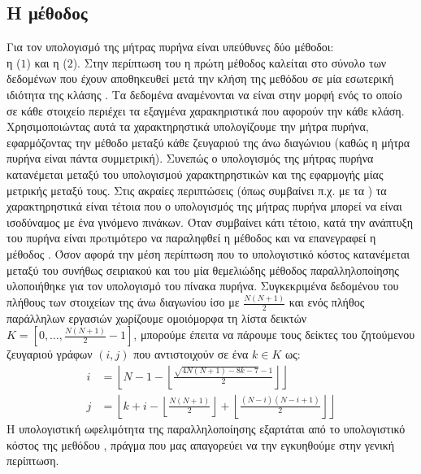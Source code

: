 \subsection{Η μέθοδος \texttt{}}
Για τον υπολογισμό της μήτρας πυρήνα είναι υπεύθυνες δύο μέθοδοι:\\ η \texttt{} ($1$) και  η \texttt{} ($2$).
Στην περίπτωση του \texttt{} η πρώτη μέθοδος καλείται στο σύνολο των δεδομένων που έχουν αποθηκευθεί μετά την κλήση της μεθόδου \texttt{} σε μία εσωτερική ιδιότητα της κλάσης \texttt{}.
Τα δεδομένα αναμένονται να είναι στην μορφή ενός \texttt{} το οποίο σε κάθε στοιχείο περιέχει τα εξαγμένα χαρακηριστικά που αφορούν την κάθε κλάση.
Χρησιμοποιώντας αυτά τα χαρακτηρηστικά υπολογίζουμε την μήτρα πυρήνα, εφαρμόζοντας την μέθοδο \texttt{} μεταξύ κάθε ζευγαριού της άνω διαγώνιου (καθώς η μήτρα πυρήνα είναι πάντα συμμετρική).
Συνεπώς ο υπολογισμός της μήτρας πυρήνα κατανέμεται μεταξύ του υπολογισμού χαρακτηρηστικών και της εφαρμογής μίας μετρικής μεταξύ τους.
Στις ακραίες περιπτώσεις (όπως συμβαίνει π.χ. με τα ) τα χαρακτηρηστικά είναι τέτοια που ο υπολογισμός της μήτρας πυρήνα μπορεί να είναι ισοδύναμος με ένα γινόμενο πινάκων.
Όταν συμβαίνει κάτι τέτοιο, κατά την ανάπτυξη του πυρήνα είναι πρoτιμότερο να παραληφθεί η μέθοδος \texttt{} και να επανεγραφεί η μέθοδος \texttt{}.
Όσον αφορά την μέση περίπτωση που το υπολογιστικό κόστος κατανέμεται μεταξύ του συνήθως σειριακού \texttt{} και του \texttt{} μία θεμελιώδης μέθοδος παραλληλοποίησης υλοποιήθηκε για τον υπολογισμό του πίνακα πυρήνα.
Συγκεκριμένα δεδομένου του πλήθους των στοιχείων της άνω διαγωνίου ίσο με $\frac{N(N+1)}{2}$ και ενός πλήθος παράλληλων εργασιών \texttt{} χωρίζουμε ομοιόμορφα τη λίστα δεικτών $K = [0, \dots, \frac{N(N+1)}{2}-1]$, μπορούμε έπειτα να πάρουμε τους δείκτες του ζητούμενου ζευγαριού γράφων $(i,j)$ που αντιστοιχούν σε ένα $k \in K$ ως:
\begin{align}
    i &= \left\lfloor N - 1 - \left\lfloor \frac{\sqrt{4N(N+1) - 8k - 7} - 1}{2}\right\rfloor \right\rfloor\\
    j &= \left\lfloor k + i - \left\lfloor \frac{N(N+1)}{2} \right\rfloor + \left\lfloor \frac{(N-i)(N-i+1)}{2} \right\rfloor \right\rfloor
\end{align}
Η υπολογιστική ωφελιμότητα της παραλληλοποίησης εξαρτάται από το υπολογιστικό κόστος της μεθόδου \texttt{}, πράγμα που μας απαγορεύει να την εγκυηθούμε στην γενική περίπτωση.

